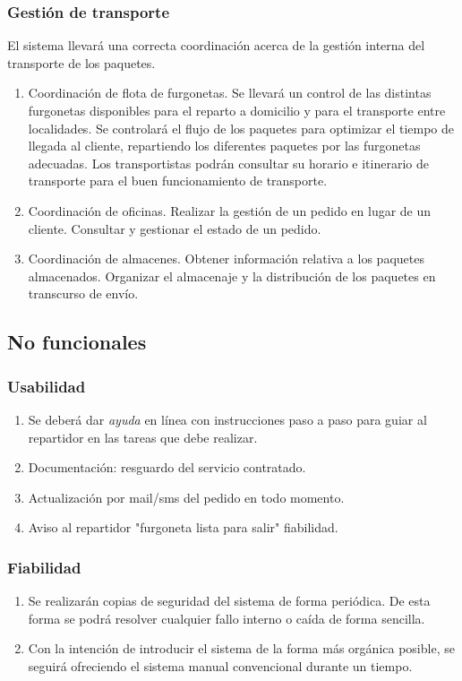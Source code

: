 \subsubsection{Gestión de transporte}
El sistema llevará una correcta coordinación acerca de la gestión interna del transporte de los paquetes.
\begin{enumerate}
	\item Coordinación de flota de furgonetas.
	\subitem Se llevará un control de las distintas furgonetas disponibles para el reparto a domicilio y para el transporte entre localidades.
	\subitem Se controlará el flujo de los paquetes para optimizar el tiempo de llegada al cliente, repartiendo los diferentes
 paquetes por las furgonetas adecuadas.
 	\subitem Los transportistas podrán consultar su horario e itinerario de transporte para el buen funcionamiento de transporte.

	\item Coordinación de oficinas.
	\subitem Realizar la gestión de un pedido en lugar de un cliente.
	\subitem Consultar y gestionar el estado de un pedido.
	
	\item Coordinación de almacenes.
	\subitem Obtener información relativa a los paquetes almacenados.
	\subitem Organizar el almacenaje y la distribución de los paquetes en transcurso de envío.


\end{enumerate}

\subsection{No funcionales}
\subsubsection{Usabilidad}
\begin{enumerate}
	\item Se deberá dar \textit{ayuda} en línea con instrucciones paso a paso para guiar al repartidor en las tareas que debe realizar.
	\item Documentación: resguardo del servicio contratado.
	\item Actualización por mail/sms del pedido en todo momento.
	\item Aviso al repartidor "furgoneta lista para salir"
	fiabilidad.
	
\end{enumerate}
\subsubsection{Fiabilidad}
\begin{enumerate}
	\item Se realizarán copias de seguridad del sistema de forma periódica. De esta forma se podrá resolver cualquier fallo interno o caída de forma sencilla.
	\item Con la intención de introducir el sistema de la forma más orgánica posible, se seguirá ofreciendo el sistema manual convencional durante un tiempo.
\end{enumerate}

